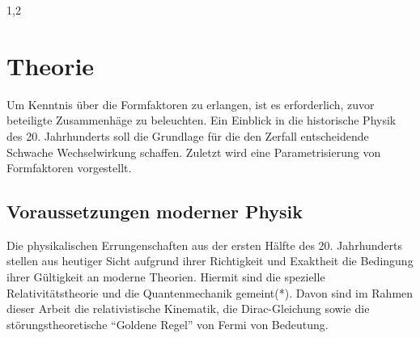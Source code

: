 \documentclass[11pt,a4paper,twoside,draft]{report}
\begin{document}
\begin{spacing}{1,2}
\chapter{Theorie}
Um Kenntnis über die Formfaktoren zu erlangen, ist es erforderlich, zuvor beteiligte Zusammenhäge zu beleuchten. Ein Einblick in die historische Physik
des 20. Jahrhunderts soll die Grundlage für die den Zerfall entscheidende Schwache Wechselwirkung schaffen. Zuletzt wird eine Parametrisierung von Formfaktoren
vorgestellt.

\section{Voraussetzungen moderner Physik}
Die physikalischen Errungenschaften aus der ersten Hälfte des 20. Jahrhunderts stellen aus heutiger Sicht aufgrund ihrer Richtigkeit und Exaktheit die 
Bedingung ihrer Gültigkeit an moderne Theorien.
Hiermit sind die spezielle Relativitätstheorie und die Quantenmechanik gemeint(*). Davon sind im Rahmen dieser 
Arbeit die relativistische Kinematik, die Dirac-Gleichung sowie die störungstheoretische ``Goldene Regel'' von Fermi
von Bedeutung.


\end{spacing}
\end{document}
